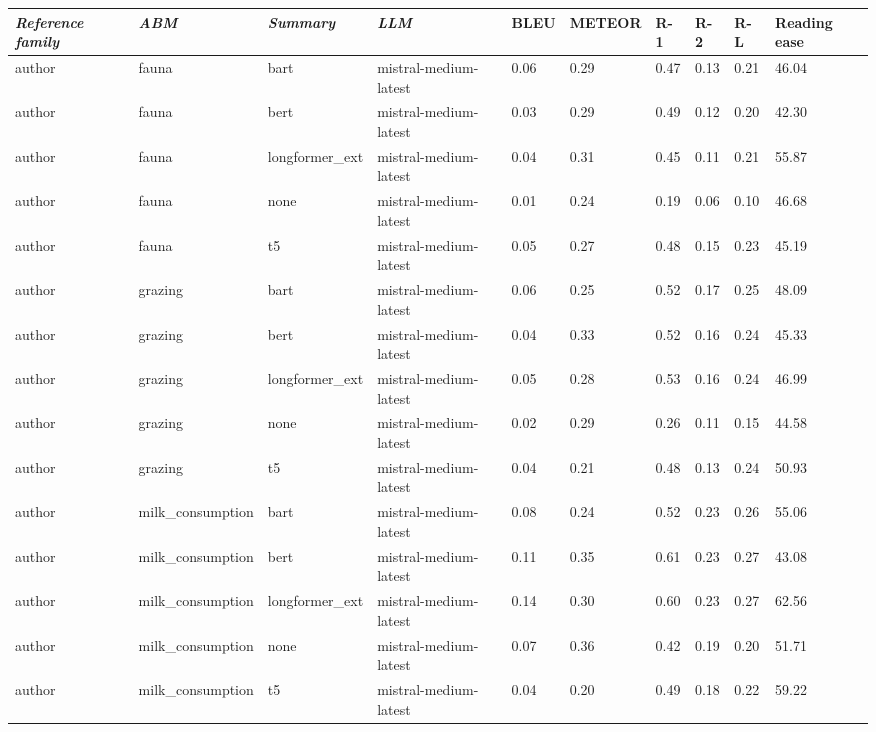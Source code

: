 \begin{tabular}{|l|l|l|l|l|l|l|l|l|l|}
\hline
\textit{\textbf{Reference family}} & \textit{\textbf{ABM}} & \textit{\textbf{Summary}} & \textit{\textbf{LLM}} & BLEU & METEOR & R-1 & R-2 & R-L & Reading ease \\
 \hline
 author & fauna & bart & mistral-medium-latest & 0.06 & 0.29 & 0.47 & 0.13 & 0.21 & 46.04 \\
 \hline
 author & fauna & bert & mistral-medium-latest & 0.03 & 0.29 & 0.49 & 0.12 & 0.20 & 42.30 \\
 \hline
 author & fauna & longformer\_ext & mistral-medium-latest & 0.04 & 0.31 & 0.45 & 0.11 & 0.21 & 55.87 \\
 \hline
 author & fauna & none & mistral-medium-latest & 0.01 & 0.24 & 0.19 & 0.06 & 0.10 & 46.68 \\
 \hline
 author & fauna & t5 & mistral-medium-latest & 0.05 & 0.27 & 0.48 & 0.15 & 0.23 & 45.19 \\
 \hline
 author & grazing & bart & mistral-medium-latest & 0.06 & 0.25 & 0.52 & 0.17 & 0.25 & 48.09 \\
 \hline
 author & grazing & bert & mistral-medium-latest & 0.04 & 0.33 & 0.52 & 0.16 & 0.24 & 45.33 \\
 \hline
 author & grazing & longformer\_ext & mistral-medium-latest & 0.05 & 0.28 & 0.53 & 0.16 & 0.24 & 46.99 \\
 \hline
 author & grazing & none & mistral-medium-latest & 0.02 & 0.29 & 0.26 & 0.11 & 0.15 & 44.58 \\
 \hline
 author & grazing & t5 & mistral-medium-latest & 0.04 & 0.21 & 0.48 & 0.13 & 0.24 & 50.93 \\
 \hline
 author & milk\_consumption & bart & mistral-medium-latest & 0.08 & 0.24 & 0.52 & 0.23 & 0.26 & 55.06 \\
 \hline
 author & milk\_consumption & bert & mistral-medium-latest & 0.11 & 0.35 & 0.61 & 0.23 & 0.27 & 43.08 \\
 \hline
 author & milk\_consumption & longformer\_ext & mistral-medium-latest & 0.14 & 0.30 & 0.60 & 0.23 & 0.27 & 62.56 \\
 \hline
 author & milk\_consumption & none & mistral-medium-latest & 0.07 & 0.36 & 0.42 & 0.19 & 0.20 & 51.71 \\
 \hline
 author & milk\_consumption & t5 & mistral-medium-latest & 0.04 & 0.20 & 0.49 & 0.18 & 0.22 & 59.22 \\
\hline
\end{tabular}
